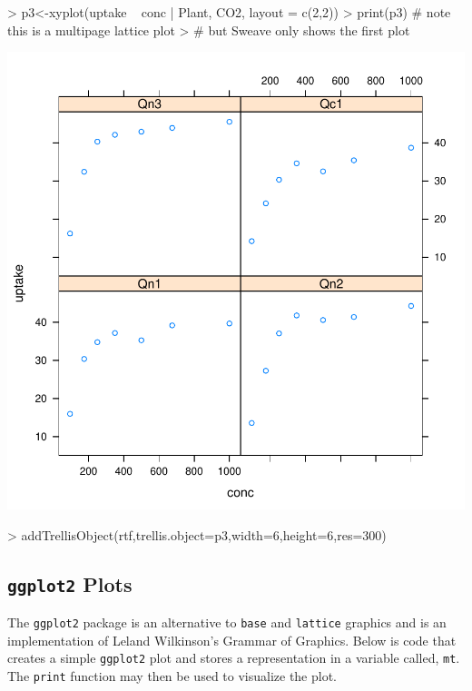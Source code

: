 \documentclass[11pt,letterpaper]{article}
\begin{document}
\begin{Schunk}
\begin{Sinput}
> p3<-xyplot(uptake ~ conc | Plant, CO2, layout = c(2,2))
> print(p3) # note this is a multipage lattice plot
>           # but Sweave only shows the first plot
\end{Sinput}
\end{Schunk}
\includegraphics{rtf-027}

\begin{Schunk}
\begin{Sinput}
> addTrellisObject(rtf,trellis.object=p3,width=6,height=6,res=300)
\end{Sinput}
\end{Schunk}


\subsection{\texttt{ggplot2} Plots}
The \texttt{ggplot2} package is an alternative to \texttt{base} and \texttt{lattice} graphics and is an implementation of Leland Wilkinson's Grammar of Graphics.  Below is code that creates a simple \texttt{ggplot2} plot and stores a representation in a variable called, \texttt{mt}.  The \texttt{print} function may then be used to visualize the plot.
\end{document}
